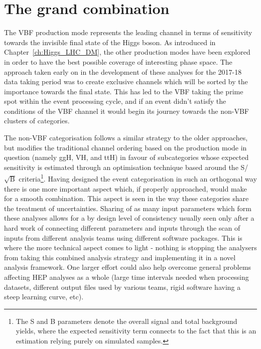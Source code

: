 \section{The grand combination}

\hspace{10pt} The VBF production mode represents the leading channel in terms of sensitivity towards the invisible final state of the Higgs boson. As introduced in Chapter~\ref{ch:Higgs_LHC_DM}, the other production modes have been explored in order to have the best possible coverage of interesting phase space. The approach taken early on in the development of these analyses for the 2017-18 data taking period was to create exclusive channels which will be sorted by the importance towards the final state. This has led to the VBF taking the prime spot within the event processing cycle, and if an event didn't satisfy the conditions of the VBF channel it would begin its journey towards the non-VBF clusters of categories. 

\hspace{10pt} The non-VBF categorisation follows a similar strategy to the older approaches, but modifies the traditional channel ordering based on the production mode in question (namely ggH, VH, and ttH) in favour of subcategories whose expected sensitivity is estimated through an optimisation technique based around the S/$\sqrt{\text{B}}$ criteria\footnote{The S and B parameters denote the overall signal and total background yields, where the expected sensitivity term connects to the fact that this is an estimation relying purely on simulated samples.}. Having designed the event categorisation in such an orthogonal way there is one more important aspect which, if properly approached, would make for a smooth combination. This aspect is seen in the way these categories share the treatment of uncertainties. Sharing of as many input parameters which form these analyses allows for a by design level of consistency usually seen only after a hard work of connecting different parameters and inputs through the scan of inputs from different analysis teams using different software packages. This is where the more technical aspect comes to light - nothing is stopping the analysers from taking this combined analysis strategy and implementing it in a novel analysis framework. One larger effort could also help overcome general problems affecting HEP analyses as a whole (large time intervals needed when processing datasets, different output files used by various teams, rigid software having a steep learning curve, etc).



